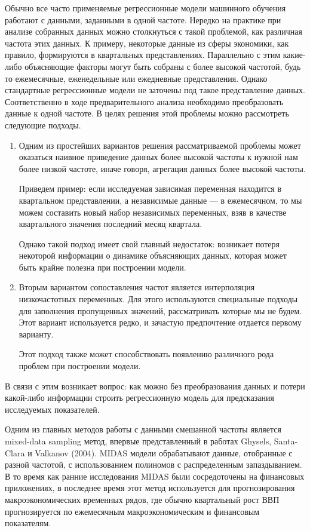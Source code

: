 \documentclass[a4paper, 12pt]{extarticle}
\begin{document}
	Обычно все часто применяемые регрессионные модели машинного обучения работают с данными, заданными в одной частоте. Нередко на практике при анализе собранных данных можно столкнуться с такой проблемой, как различная частота этих данных. К примеру, некоторые данные из сферы экономики, как правило, формируются в квартальных представлениях. Параллельно с этим какие-либо объясняющие факторы могут быть собраны с более высокой частотой, будь то ежемесячные, еженедельные или ежедневные представления. Однако стандартные регрессионные модели не заточены под такое представление данных. Соответственно в ходе предварительного анализа необходимо преобразовать данные к одной частоте. В целях решения этой проблемы можно рассмотреть следующие подходы.
	\begin{enumerate}
		\item Одним из простейших вариантов решения рассматриваемой проблемы может оказаться наивное приведение данных более высокой частоты к нужной нам более низкой частоте, иначе говоря, агрегация данных более высокой частоты. 
		
		Приведем пример: если исследуемая зависимая переменная находится в квартальном представлении, а независимые данные --- в ежемесячном, то мы можем составить новый набор независимых переменных, взяв в качестве квартального значения последний месяц квартала.
		
		Однако такой подход имеет свой главный недостаток:
		возникает потеря некоторой информации о динамике объясняющих данных, которая может быть крайне полезна при построении модели.
		\item Вторым вариантом сопоставления частот является интерполяция низкочастотных
		переменных. Для этого используются специальные подходы для заполнения пропущенных значений, рассматривать которые мы не будем. Этот вариант используется редко, и зачастую предпочтение отдается первому варианту.
		
		Этот подход также может способствовать появлению различного рода проблем при построении модели.
	\end{enumerate}
	В связи с этим возникает вопрос: как можно без преобразования данных и потери какой-либо информации строить регрессионную модель для предсказания исследуемых показателей. 
	
	Одним из главных методов работы с данными смешанной частоты является mixed-data sampling метод, впервые представленный в работах Ghysels, Santa-Clara и Valkanov (2004). MIDAS модели
	обрабатывают данные, отобранные с разной частотой, с
	использованием полиномов с распределенным запаздыванием. В то время как ранние исследования MIDAS были сосредоточены на финансовых
	приложениях, в последнее время этот метод
	используется для прогнозирования макроэкономических временных рядов, где обычно квартальный
	рост ВВП прогнозируется по ежемесячным макроэкономическим и финансовым показателям.
	
\end{document}
